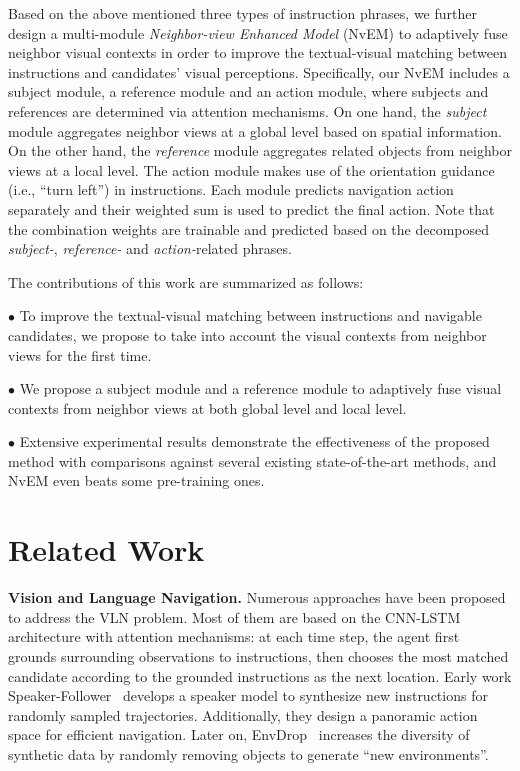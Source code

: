\documentclass[sigconf]{acmart}
\begin{document}
Based on the above mentioned three types of instruction phrases, we further design a multi-module \textit{Neighbor-view Enhanced Model} (NvEM) to adaptively fuse neighbor visual contexts in order to improve the textual-visual matching between instructions and candidates' visual perceptions. 
Specifically, our NvEM includes a subject module, a reference module and an action module,  where subjects and references are determined via attention mechanisms.
On one hand, the \textit{subject} module aggregates neighbor views at a global level based on spatial information. 
On the other hand, the \textit{reference} module aggregates related objects from neighbor views at a local level.
The action module makes use of the  orientation guidance (i.e., ``turn left'') in instructions.
Each module predicts navigation action separately and their weighted sum is used to predict the final action.
Note that the combination weights are trainable and predicted based on the decomposed \textit{subject-}, \textit{reference-} and \textit{action-}related phrases.


The contributions of this work are summarized as follows:

$\bullet$ To improve the textual-visual matching between instructions and navigable candidates, we propose to take into account the visual contexts from neighbor views for the first time.

$\bullet$ We propose a subject module and a reference module to adaptively fuse visual contexts from neighbor views at both global level and local level.


$\bullet$ Extensive experimental results demonstrate the effectiveness of the proposed method with comparisons against several existing state-of-the-art methods, and NvEM even beats some pre-training ones.



\vspace{-3mm}
\section{Related Work}


\noindent\textbf{Vision and Language Navigation.} Numerous approaches have been proposed to address the VLN problem.
Most of them are based on the CNN-LSTM architecture with attention mechanisms: at each time step, the agent first grounds surrounding observations to instructions, then chooses the most matched candidate according to the grounded instructions as the next location. 
Early work Speaker-Follower~\cite{fried2018speaker} develops a speaker model to synthesize new instructions for randomly sampled trajectories. 
Additionally, they design a panoramic action space for efficient navigation. 
Later on, EnvDrop~\cite{tan2019envdrop} increases the diversity of synthetic data by randomly removing objects to generate ``new environments''. 
\end{document}
